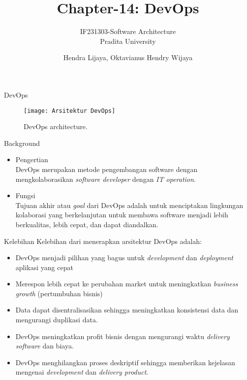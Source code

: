 \documentclass[aspectratio=169, table]{beamer}
\title{Chapter-14: DevOps}
\subtitle{IF231303-Software Architecture\\Pradita University}
\author{Hendra Lijaya, Oktavianus Hendry Wijaya}
\begin{document}
	
	\begin{frame}[plain]
		\maketitle
	\end{frame}
	
	\begin{frame}{DevOps}
		\begin{figure}[h]
			\centering
			\texttt{[image: Arsitektur DevOps]}
			\caption{DevOps architecture.}
			\label{fig:DevOps}
		\end{figure}
	\end{frame}
	
	\begin{frame}{Background}
		\begin{itemize}
			\item Pengertian
			\\DevOps merupakan metode pengembangan software dengan mengkolaborasikan \textit{software developer} dengan \textit{IT operation}. 
			\item Fungsi
			\\Tujuan akhir atau \textit{goal} dari DevOps adalah untuk menciptakan lingkungan kolaborasi yang berkelanjutan untuk membawa software menjadi lebih berkualitas, lebih cepat, dan dapat diandalkan.
		\end{itemize}
	\end{frame}
	
	\begin{frame}{Kelebihan}
		Kelebihan dari menerapkan arsitektur DevOps adalah:
		\begin{itemize}
			\item DevOps menjadi pilihan yang bagus untuk \textit{development} dan \textit{deployment} aplikasi yang cepat
			\item Merespon lebih cepat ke perubahan market untuk meningkatkan \textit{business growth} (pertumbuhan bisnis)
			\item Data dapat disentralisasikan sehingga meningkatkan konsistensi data dan mengurangi duplikasi data.
			\item DevOps meningkatkan profit bisnis dengan mengurangi waktu \textit{delivery software} dan biaya.
			\item DevOps menghilangkan proses deskriptif sehingga memberikan kejelasan mengenai \textit{development} dan \textit{delivery product}.
			
		\end{itemize}
	\end{frame}
	
\end{document}
